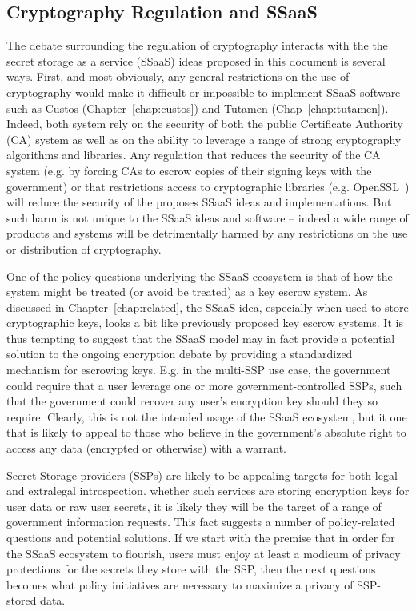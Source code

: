 \subsection{Cryptography Regulation and SSaaS}

The debate surrounding the regulation of cryptography interacts with
the the secret storage as a service (SSaaS) ideas proposed in this
document is several ways. First, and most obviously, any general
restrictions on the use of cryptography would make it difficult or
impossible to implement SSaaS software such as Custos
(Chapter~\ref{chap:custos}) and Tutamen
(Chap~\ref{chap:tutamen}). Indeed, both system rely on the security of
both the public Certificate Authority (CA) system as well as on the
ability to leverage a range of strong cryptography algorithms and
libraries. Any regulation that reduces the security of the CA system
(e.g. by forcing CAs to escrow copies of their signing keys with the
government) or that restrictions access to cryptographic libraries
(e.g. OpenSSL~\cite{openssl}) will reduce the security of the proposes
SSaaS ideas and implementations. But such harm is not unique to the
SSaaS ideas and software -- indeed a wide range of products and
systems will be detrimentally harmed by any restrictions on the use or
distribution of cryptography.

One of the policy questions underlying the SSaaS ecosystem is that of
how the system might be treated (or avoid be treated) as a key escrow
system. As discussed in Chapter~\ref{chap:related}, the SSaaS idea,
especially when used to store cryptographic keys, looks a bit like
previously proposed key escrow systems. It is thus tempting to suggest
that the SSaaS model may in fact provide a potential solution to the
ongoing encryption debate by providing a standardized mechanism for
escrowing keys. E.g. in the multi-SSP use case, the government could
require that a user leverage one or more government-controlled SSPs,
such that the government could recover any user's encryption key
should they so require. Clearly, this is not the intended usage of the
SSaaS ecosystem, but it one that is likely to appeal to those who
believe in the government's absolute right to access any data
(encrypted or otherwise) with a warrant.


Secret Storage providers (SSPs) are likely to be appealing targets for
both legal and extralegal introspection. whether such services are
storing encryption keys for user data or raw user secrets, it is
likely they will be the target of a range of government information
requests. This fact suggests a number of policy-related questions and
potential solutions. If we start with the premise that in order for
the SSaaS ecosystem to flourish, users must enjoy at least a modicum
of privacy protections for the secrets they store with the SSP, then
the next questions becomes what policy initiatives are necessary to
maximize a privacy of SSP-stored data.

